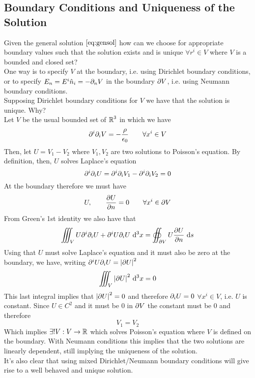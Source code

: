 \documentclass[../electromagnetism]{subfiles}
\begin{document}
\subsection{Boundary Conditions and Uniqueness of the Solution}
Given the general solution $\eqref{eq:gensol}$ how can we choose for appropriate boundary values such that the solution exists and is unique $\forall r^i\in V$ where $V$ is a bounded and closed set?\\
One way is to specify $V$ at the boundary, i.e. using Dirichlet boundary conditions, or to specify $E_n=E^i\hat{n}_i=-\partial_nV$ in the boundary $\partial V$, i.e. using Neumann boundary conditions.\\
Supposing Dirichlet boundary conditions for $V$ we have that the solution is unique. Why?\\
Let $V$ be the usual bounded set of $\operatorname{\mathbb{R}}^3$ in which we have
\begin{equation*}
	\partial^i\partial_iV=-\frac{\rho}{\epsilon_0}\qquad\forall x^i\in V
\end{equation*}
Then, let $U=V_1-V_2$ where $V_1,V_2$ are two solutions to Poisson's equation. By definition, then, $U$ solves Laplace's equation
\begin{equation*}
	\partial^i\partial_iU=\partial^i\partial_iV_1-\partial^i\partial_iV_2=0
\end{equation*}
At the boundary therefore we must have
\begin{equation*}
	U,\qquad\pdv{U}{n}=0\qquad\forall x^i\in\partial V
\end{equation*}
From Green's 1st identity we also have that
\begin{equation*}
	\iiint_VU\partial^i\partial_iU+\partial^iU\partial_iU\ \mathrm{d}^3x=\oiint_{\partial V}U\pdv{U}{n}\ \mathrm{d} s
\end{equation*}
Using that $U$ must solve Laplace's equation and it must also be zero at the boundary, we have, writing $\partial^iU\partial_iU=\abs{\partial U}^2$
\begin{equation*}
	\iiint_V\abs{\partial U}^2\ \mathrm{d}^3x=0
\end{equation*}
This last integral implies that $\abs{\partial U}^2=0$ and therefore $\partial_iU=0$ $\forall x^i\in V$, i.e. $U$ is constant. Since $U\in C^2$ and it must be $0$ in $\partial V$ the constant must be 0 and therefore
\begin{equation*}
	V_1=V_2
\end{equation*}
Which implies $\exists!V:V\to\operatorname{\mathbb{R}}$ which solves Poisson's equation where $V$ is defined on the boundary. With Neumann conditions this implies that the two solutions are linearly dependent, still implying the uniqueness of the solution.\\
It's also clear that using mixed Dirichlet/Neumann boundary conditions will give rise to a well behaved and unique solution.
\end{document}
